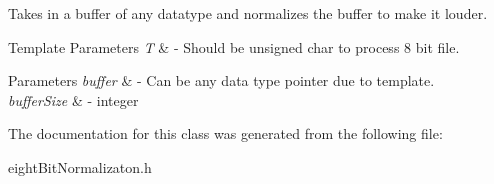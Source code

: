 \begin{DoxyItemize}
\item Takes in a buffer of any datatype and normalizes the buffer to make it louder. 
\end{DoxyItemize}


\begin{DoxyTemplParams}{Template Parameters}
{\em T} & -\/ Should be unsigned char to process 8 bit file. \\
\hline
\end{DoxyTemplParams}

\begin{DoxyParams}{Parameters}
{\em buffer} & -\/ Can be any data type pointer due to template. \\
\hline
{\em buffer\+Size} & -\/ integer \\
\hline
\end{DoxyParams}


The documentation for this class was generated from the following file\+:\begin{DoxyCompactItemize}
\item 
eight\+Bit\+Normalizaton.\+h\end{DoxyCompactItemize}
